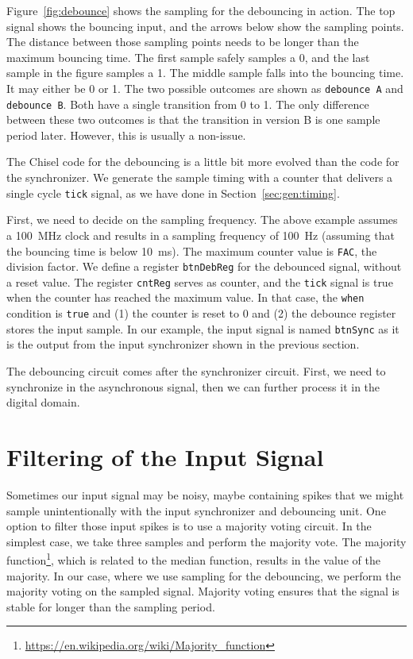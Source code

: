 \documentclass[%
    10pt,
    headinclude, footexclude,
    openright, %
    notitlepage,
    cleardoubleempty,
    headsepline,
    pointlessnumbers,
    bibtotoc, idxtotoc,
    ]{scrbook}
\newcommand{\code}[1]{{\small{\texttt{#1}}}}
\newcommand{\myref}[2]{\href{#1}{#2}}
\renewcommand{\myref}[2]{{#2}{\footnote{\url{#1}}}}
\begin{document}
Figure~\ref{fig:debounce} shows the sampling for the debouncing in action.
The top signal shows the bouncing input, and the arrows below show the sampling
points. The distance between those sampling points needs to be longer
than the maximum bouncing time. The first sample safely samples a 0, and the last
sample in the figure samples a 1. The middle sample falls into the
bouncing time. It may either be 0 or 1. The two possible outcomes are
shown as \code{debounce A} and \code{debounce B}. 
Both have a single transition from 0 to 1. The only difference between these
two outcomes is that the transition in version B is one sample period later.
However, this is usually a non-issue.

The Chisel code for the debouncing is a little bit more evolved than the
code for the synchronizer.
We generate the sample timing with a counter that delivers a single
cycle \code{tick} signal, as we have done in Section~\ref{sec:gen:timing}.


First, we need to decide on the sampling frequency. The above example
assumes a 100~MHz clock and results in a sampling frequency of 100~Hz
(assuming that the bouncing time is below 10~ms). The maximum
counter value is \code{FAC}, the division factor.
We define a register \code{btnDebReg} for the debounced signal,
without a reset value. The register \code{cntReg} serves
as counter, and the \code{tick} signal is true when the counter has
reached the maximum value. In that case, the \code{when} condition
is \code{true} and (1) the counter is reset to 0 and (2) the debounce
register stores the input sample. In our example, the input signal is named
\code{btnSync} as it is the output from the input synchronizer shown
in the previous section.

The debouncing circuit comes after the synchronizer circuit.
First, we need to synchronize in the asynchronous signal, then
we can further process it in the digital domain.

\section{Filtering of the Input Signal}


Sometimes our input signal may be noisy, maybe containing spikes
that we might sample unintentionally with the input synchronizer and
debouncing unit.
One option to filter those input spikes is to use a majority voting
circuit. In the simplest case, we take three samples and perform
the majority vote. The \myref{https://en.wikipedia.org/wiki/Majority_function}{majority function},
which is related to the median function, results in the value of the majority.
In our case, where we use sampling for the debouncing, we perform the
majority voting on the sampled signal.
Majority voting ensures that the signal is stable for longer than the sampling period.
\end{document}
